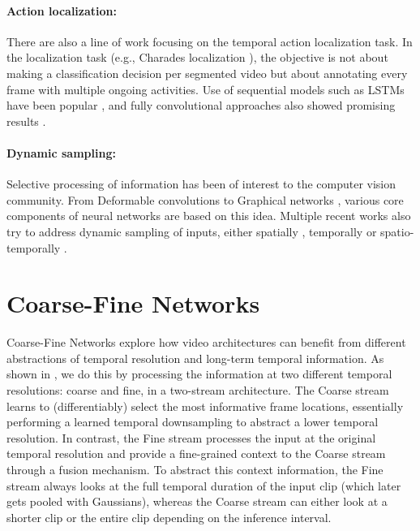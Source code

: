 \documentclass[final]{cvpr}
\begin{document}
\vspace{-3pt}
\paragraph{Action localization:} There are also a line of work focusing on the temporal action localization task. In the localization task (e.g., Charades localization \cite{sigurdsson2016hollywood}), the objective is not about making a classification decision per segmented video but about annotating every frame with multiple ongoing activities. Use of sequential models such as LSTMs have been popular \cite{yeung2016end,escorcia2016daps,yeung2018every}, and fully convolutional approaches also showed promising results \cite{shou2016temporal,zhao2017temporal,xu2017r,shou2017cdc}.

\vspace{-3pt}
\paragraph{Dynamic sampling:} Selective processing of information has been of interest to the computer vision community. From Deformable convolutions \cite{dai2017deformable} to Graphical networks \cite{scarselli2008graph, liu2017dynamic, xinyi2018capsule}, various core components of neural networks are based on this idea. Multiple recent works also try to address dynamic sampling of inputs, either spatially \cite{recasens2018learning, jaderberg2015spatial, gao2020beyond}, temporally \cite{zolfaghari2018eco, wu2019adaframe, korbar2019scsampler, wu2019liteeval} or spatio-temporally \cite{meng2020ar}. 













\vspace{-2mm}
\section{Coarse-Fine Networks}
\vspace{-2mm}

Coarse-Fine Networks explore how video architectures can benefit from different abstractions of temporal resolution and long-term temporal information. As shown in , we do this by processing the information at two different temporal resolutions: coarse and fine, in a two-stream architecture. The Coarse stream learns to (differentiably) select the most informative frame locations, essentially performing a learned temporal downsampling to abstract a lower temporal resolution. In contrast, the Fine stream processes the input at the original temporal resolution and provide a fine-grained context to the Coarse stream through a fusion mechanism. To abstract this context information, the Fine stream always looks at the full temporal duration of the input clip (which later gets pooled with Gaussians), whereas the Coarse stream can either look at a shorter clip or the entire clip depending on the inference interval.
\end{document}
